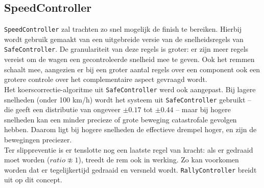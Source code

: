 \documentclass[10pt,a4paper]{article}
\begin{document}
		\subsection{SpeedController}
			\texttt{SpeedController} zal trachten zo snel mogelijk de finish te bereiken. Hierbij wordt gebruik gemaakt van een uitgebreide versie van de snelheidsregels van \texttt{SafeController}. De granulariteit van deze regels is groter: er zijn meer regels vereist om de wagen een gecontroleerde snelheid mee te geven. Ook het remmen schaalt mee, aangezien er bij een groter aantal regels over een component ook een grotere controle over het complementaire aspect gevraagd wordt.\\

			Het koerscorrectie-algoritme uit \texttt{SafeController} werd ook aangepast. Bij lagere snelheden (onder 100 km/h) wordt het systeem uit \texttt{SafeController} gebruikt -- die geeft een distributie van ongeveer $\pm 0.17$ tot $\pm 0.44$ -- maar bij hogere snelheden kan een minder precieze of grote beweging catastrofale gevolgen hebben. Daarom ligt bij hogere snelheden de effectieve drempel hoger, en zijn de bewegingen preciezer.\\

			Ter slippreventie is er tenslotte nog een laatste regel van kracht: als er gedraaid moet worden ($ratio \not\approx 1$), treedt de rem ook in werking. Zo kan voorkomen worden dat er tegelijkertijd gedraaid en versneld wordt. \texttt{RallyController} breidt uit op dit concept.
\end{document}
